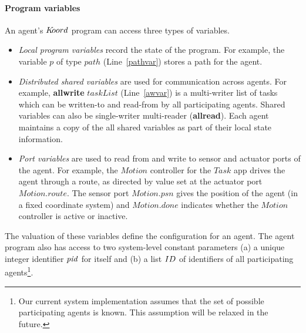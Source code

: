 \paragraph{Program variables}
An agent's $K\kern-2pt oord$ program can access three types of variables. 
%
\begin{itemize}
	\item {\em Local program variables\/} record the state of the program. For example, the variable $p$ of type $\mathit{path}$ (Line~\ref{pathvar}) stores a path for the agent. 
\item {\em Distributed shared variables\/} are used for communication across agents.  For example, {\bf allwrite} $\mathit{taskList}$ (Line~\ref{awvar}) is a multi-writer list of tasks which can be written-to and read-from by all participating agents. Shared variables can also be single-writer multi-reader ({\bf allread}). Each agent maintains a copy of the all shared variables as part of their local state information. 

\item {\em Port variables\/} are used to read from and write to sensor and actuator ports of the agent. For example, the $\mathit{Motion}$ controller for the $\mathit{Task}$ app  drives the agent  through a route, as directed by value set at the actuator port $\mathit{Motion.route}$. The sensor port $\mathit{Motion.psn}$ gives the position of the agent (in a fixed coordinate system) and $\mathit{Motion.done}$ indicates  whether the $\mathit{Motion}$ controller is active or inactive.
\end{itemize}
The valuation of these variables define the configuration for an agent. 
The agent program also has access to two system-level constant parameters (a) a unique integer identifier $\mathit{pid}$ for itself and (b) a list $ID$ of identifiers of all participating agents\footnote{Our current system implementation assumes that the set of possible participating agents is known. This assumption will be relaxed in the future.}. 

